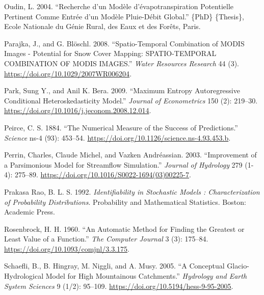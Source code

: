 \documentclass[
  letterpaper,
  DIV=11,
  numbers=noendperiod]{scrreprt}
\newlength{\cslhangindent}
\newlength{\cslentryspacingunit} %
\newenvironment{CSLReferences}[2] %
 {%
  \setlength{\parindent}{0pt}
  \ifodd #1
  \let\oldpar\par
  \def\par{\hangindent=\cslhangindent\oldpar}
  \fi
  \setlength{\parskip}{#2\cslentryspacingunit}
 }%
 {}
\begin{document}
\begin{CSLReferences}{1}{0}
\leavevmode{}%
Oudin, L. 2004. {``Recherche d'un Modèle d'évapotranspiration
Potentielle Pertinent Comme Entrée d'un Modèle Pluie-Débit Global.''}
\{PhD\} \{Thesis\}, Ecole Nationale du Génie Rural, des Eaux et des
Forêts, Paris.

\leavevmode{}%
Parajka, J., and G. Blöschl. 2008. {``Spatio-Temporal Combination of
{MODIS} Images - Potential for Snow Cover Mapping: {SPATIO}-{TEMPORAL}
{COMBINATION} {OF} {MODIS} {IMAGES}.''} \emph{Water Resources Research}
44 (3). \url{https://doi.org/10.1029/2007WR006204}.

\leavevmode{}%
Park, Sung Y., and Anil K. Bera. 2009. {``Maximum Entropy Autoregressive
Conditional Heteroskedasticity Model.''} \emph{Journal of Econometrics}
150 (2): 219--30. \url{https://doi.org/10.1016/j.jeconom.2008.12.014}.

\leavevmode{}%
Peirce, C. S. 1884. {``The {Numerical} {Measure} of the {Success} of
{Predictions}.''} \emph{Science} ns-4 (93): 453--54.
\url{https://doi.org/10.1126/science.ns-4.93.453.b}.

\leavevmode{}%
Perrin, Charles, Claude Michel, and Vazken Andréassian. 2003.
{``Improvement of a Parsimonious Model for Streamflow Simulation.''}
\emph{Journal of Hydrology} 279 (1-4): 275--89.
\url{https://doi.org/10.1016/S0022-1694(03)00225-7}.

\leavevmode{}%
Prakasa Rao, B. L. S. 1992. \emph{Identifiability in Stochastic Models :
Characterization of Probability Distributions}. Probability and
Mathematical Statistics. Boston: Academic Press.

\leavevmode{}%
Rosenbrock, H. H. 1960. {``An {Automatic} {Method} for {Finding} the
{Greatest} or {Least} {Value} of a {Function}.''} \emph{The Computer
Journal} 3 (3): 175--84. \url{https://doi.org/10.1093/comjnl/3.3.175}.

\leavevmode{}%
Schaefli, B., B. Hingray, M. Niggli, and A. Musy. 2005. {``A Conceptual
Glacio-Hydrological Model for High Mountainous Catchments.''}
\emph{Hydrology and Earth System Sciences} 9 (1/2): 95--109.
\url{https://doi.org/10.5194/hess-9-95-2005}.


\end{CSLReferences}
\end{document}
